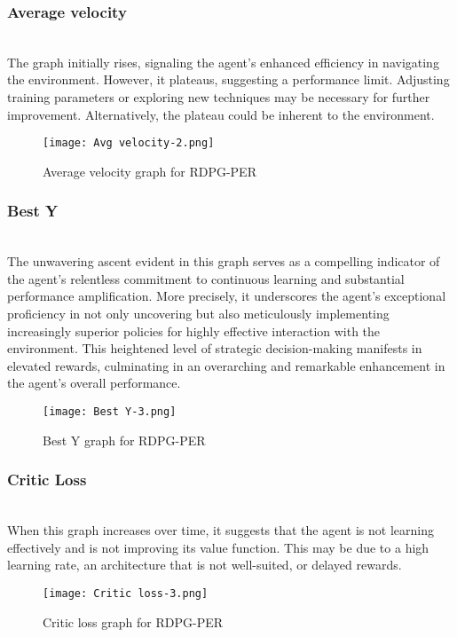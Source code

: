 \documentclass[preprint,12pt]{elsarticle}
\begin{document}
\subsubsection{Average velocity}\\
The graph initially rises, signaling the agent's enhanced efficiency in navigating the environment. However, it plateaus, suggesting a performance limit. Adjusting training parameters or exploring new techniques may be necessary for further improvement. Alternatively, the plateau could be inherent to the environment.\\
\graphicspath{ {./images/} }
\begin{figure}[!htbp]
  \centering
  \texttt{[image: Avg velocity-2.png]}
  \caption{Average velocity graph for RDPG-PER}  
  \label{fig:avg_velocity}
\end{figure}


\subsubsection{Best Y}\\
The unwavering ascent evident in this graph serves as a compelling indicator of the agent's relentless commitment to continuous learning and substantial performance amplification. More precisely, it underscores the agent's exceptional proficiency in not only uncovering but also meticulously implementing increasingly superior policies for highly effective interaction with the environment. This heightened level of strategic decision-making manifests in elevated rewards, culminating in an overarching and remarkable enhancement in the agent's overall performance.

\graphicspath{ {./images/} }
\begin{figure}[!htbp]
  \centering
  \texttt{[image: Best Y-3.png]}
  \caption{Best Y graph for RDPG-PER}  
  \label{fig:best_y}
\end{figure}


\subsubsection{Critic Loss}\\
When this graph increases over time, it suggests that the agent is not learning effectively and is not improving its value function. This may be due to a high learning rate, an architecture that is not well-suited, or delayed rewards.
\graphicspath{ {./images/} }
\begin{figure}[!htbp]
  \centering
  \texttt{[image: Critic loss-3.png]}
  \caption{Critic loss graph for RDPG-PER}
  \label{fig:critic_loss}
\end{figure}
\end{document}
